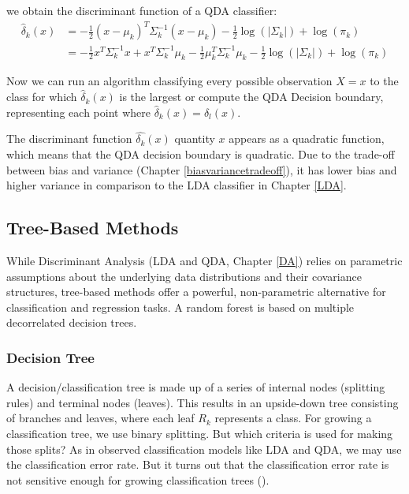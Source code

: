 \documentclass[12pt,a4paper,titlepage]{article}
\numberwithin{equation}{section}
\numberwithin{table}{section}
\numberwithin{figure}{section}
\begin{document}
        \noindent we obtain the discriminant function of a QDA classifier:
        \begin{align}
        \label{eq:dfqda}
        \hat\delta_k(x) &= - \frac{1}{2}\left(x-\mu_k\right)^T\Sigma_k^{-1}\left(x-\mu_k\right)
        - \frac{1}{2}\log\left(|\Sigma_k|\right)
        + \log(\pi_k) \nonumber\\
        &= - \frac{1}{2}x^T \Sigma_k^{-1}x
        + x^T \Sigma_k^{-1}\mu_k
        - \frac{1}{2}\mu_k^T\Sigma_k^{-1}\mu_k
        - \frac{1}{2}\log\left(|\Sigma_k|\right)
        + \log(\pi_k)
        \end{align}
        
        \noindent Now we can run an algorithm classifying every possible observation $X=x$ to the class for which $\hat\delta_k(x)$ is the largest or compute the QDA Decision boundary, representing each point where $\hat\delta_k(x) = \hat\delta_l(x)$.
        
        \noindent The discriminant function $\hat{\delta_k}(x)$ quantity $x$ appears as a quadratic function, which means that the QDA decision boundary is quadratic. Due to the trade-off between bias and variance (Chapter \ref{biasvariancetradeoff}), it has lower bias and higher variance in comparison to the LDA classifier in Chapter \ref{LDA}.

    \subsection{Tree-Based Methods}\label{treebasedmethods}
    While Discriminant Analysis (LDA and QDA, Chapter \ref{DA}) relies on parametric assumptions about the underlying data distributions and their covariance structures, tree-based methods offer a powerful, non-parametric alternative for classification and regression tasks. A random forest is based on multiple decorrelated decision trees.
        \subsubsection{Decision Tree}
        A decision/classification tree is made up of a series of internal nodes (splitting rules) and terminal nodes (leaves). This results in an upside-down tree consisting of branches and leaves, where each leaf $R_k$ represents a class.
        For growing a classification tree, we use binary splitting. But which criteria is used for making those splits?
        As in observed classification models like LDA and QDA, we may use the classification error rate. But it turns out that the classification error rate is not sensitive enough for growing classification trees (\cite[p.336]{ISLR}).
        
\end{document}
